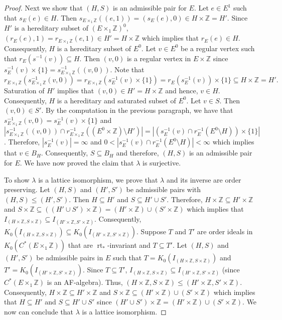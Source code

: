 \documentclass[12pt]{amsbook}%
\newcommand{\lt}{\operatorname{rt}}
\theoremstyle{defin}
\theoremstyle{remark}
\numberwithin{equation}{chapter}
\numberwithin{theor}{section}
\newcommand{\ZZ}{\mathbb{Z}}
\begin{document}
\begin{proof}
Next we show that $(H, S)$ is an admissible pair for $E$.  Let $e \in E^1$ such that $s_E (e ) \in H$.  Then $s_{E \times_1 \ZZ } ( ( e, 1) )  = ( s_E ( e) , 0 ) \in H \times \ZZ = H'$.  Since $H'$ is a hereditary subset of $(E \times_1 \ZZ)^0$, $( r_E (e), 1) = r_{ E\times_1 \ZZ } ( e, 1) \in H' = H \times \ZZ$ which implies that $r_E (e) \in H$.  Consequently, $H$ is a hereditary subset of $E^0$.  Let $v \in E^0$ be a regular vertex such that $r_E ( s^{-1} ( v ) ) \subseteq H$.  Then $(v,0)$ is a regular vertex in $E \times \ZZ$ since $s_{E}^{-1} ( v) \times \{ 1\} = s_{ E \times_1 \ZZ }^{-1} ( (v, 0) )$.  Note that 
\[
r_{ E \times_1 \ZZ} ( s_{ E \times_1\ZZ}^{-1} ( v, 0) ) = r_{E \times_1\ZZ} ( s_E^{-1} ( v) \times \{1\} ) = r_{E}( s_E^{-1} ( v) ) \times \{ 1 \} \subseteq H \times \ZZ = H'.
\]
Saturation of $H'$ implies that $(v,0 ) \in H' = H \times \ZZ$ and hence, $v \in H$.  Consequently, $H$ is a hereditary and saturated subset of $E^0$.  Let $v \in S$.  Then $(v, 0 ) \in S'$.  By the computation in the previous paragraph, we have that $s_{ E \times_1 \ZZ}^{-1} ( v, 0) = s_{E}^{-1} (v) \times \{ 1 \}$ and $| s_{E\times_1\ZZ}^{-1} ( (v,0) ) \cap r_{E\times_1\ZZ}^{-1} ( (E^0 \times\ZZ) \setminus H') |  = | ( s_E^{-1}(v) \cap  r_{E}^{-1} ( E^0 \setminus H ) ) \times \{ 1 \} |$.  Therefore, $| s_E^{-1}(v) | = \infty$ and $0 < |s_E^{-1}(v) \cap  r_{E}^{-1} ( E^0 \setminus H )| <\infty$ which implies that $v \in B_H$.  Consequently, $S \subseteq B_H$ and therefore, $(H, S)$ is an admissible pair for $E$.  We have now proved the claim that $\lambda$ is surjective.  

To show $\lambda$ is a lattice isomorphism, we prove that $\lambda$ and its inverse are order preserving.   Let $(H, S )$ and $(H' ,S')$ be admissible pairs with $(H, S ) \leq ( H' , S')$.  Then $H \subseteq H'$ and $S \subseteq H' \cup S'$.  Therefore, $H \times \ZZ \subseteq H' \times \ZZ$ and $S \times \ZZ \subseteq ( ( H ' \cup S' )  \times \ZZ ) = ( H' \times \ZZ ) \cup ( S' \times \ZZ )$ which implies that $I_{ ( H \times \ZZ , S \times \ZZ ) } \subseteq I_{ ( H' \times \ZZ , S' \times \ZZ ) }$.  Consequently, $K_ 0 ( I_{ ( H \times \ZZ , S \times \ZZ ) } )  \subseteq K_0 (  I_{ ( H' \times \ZZ , S' \times \ZZ ) } )$.  Suppose $T$ and $T'$ are order ideals in $K_0 ( C^*( E \times_1 \ZZ ) )$ that are $\lt_*$-invariant and $T \subseteq T'$.  Let $(H, S)$ and $(H',S')$ be admissible pairs in $E$ such that $T = K_ 0 ( I_{ ( H \times \ZZ , S \times \ZZ ) } )$ and $T' = K_0 (  I_{ ( H' \times \ZZ , S' \times \ZZ ) } )$.  Since $T \subseteq T'$, $I_{ ( H \times \ZZ , S \times \ZZ ) } \subseteq I_{ ( H' \times \ZZ , S' \times \ZZ ) }$ (since $C^*(E\times_1\ZZ)$ is an AF-algebra).  Thus, $ ( H \times \ZZ , S \times \ZZ ) \leq   ( H' \times \ZZ , S' \times \ZZ )$.  Consequently, $H \times \ZZ \subseteq H' \times \ZZ$ and $S \times \ZZ \subseteq ( H ' \times \ZZ ) \cup ( S' \times \ZZ )$ which implies that $H \subseteq H'$ and $S \subseteq H' \cup S'$ since $( H '\cup S' ) \times \ZZ = ( H ' \times \ZZ ) \cup ( S' \times \ZZ )$.  We now can conclude that $\lambda$ is a lattice isomorphism.


\end{proof}
\end{document}
